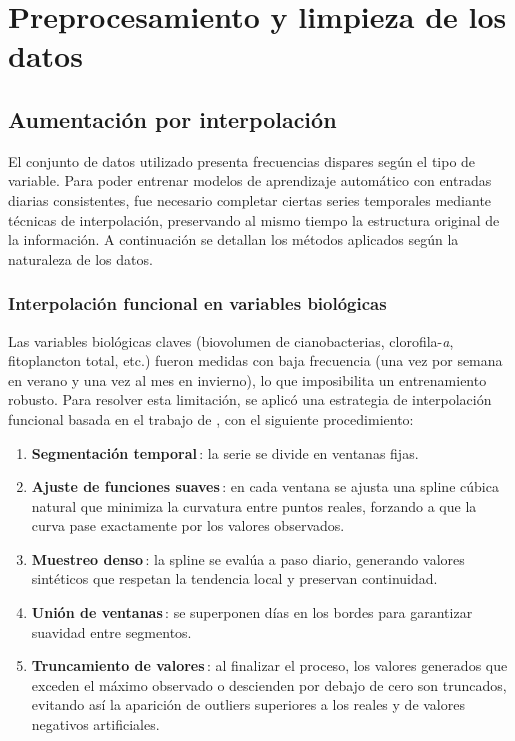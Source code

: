 \documentclass[11pt]{report}
\begin{document}
\section{Preprocesamiento y limpieza de los datos}

\subsection{Aumentación por interpolación}

El conjunto de datos utilizado presenta frecuencias dispares según el tipo de variable. Para poder entrenar modelos de aprendizaje automático con entradas diarias consistentes, fue necesario completar ciertas series temporales mediante técnicas de interpolación, preservando al mismo tiempo la estructura original de la información. A continuación se detallan los métodos aplicados según la naturaleza de los datos.

\subsubsection{Interpolación funcional en variables biológicas}

Las variables biológicas claves (biovolumen de cianobacterias, clorofila-\textit{a}, fitoplancton total, etc.) fueron medidas con baja frecuencia (una vez por semana en verano y una vez al mes en invierno), lo que imposibilita un entrenamiento robusto. Para resolver esta limitación, se aplicó una estrategia de interpolación funcional basada en el trabajo de \citep{Oh2020}, con el siguiente procedimiento:


\begin{enumerate}[noitemsep]
  \item \textbf{Segmentación temporal}\,: la serie se divide en ventanas fijas.
  \item \textbf{Ajuste de funciones suaves}\,: en cada ventana se ajusta una spline cúbica natural que minimiza la curvatura entre puntos reales, forzando a que la curva pase exactamente por los valores observados.
  \item \textbf{Muestreo denso}\,: la spline se evalúa a paso diario, generando valores sintéticos que respetan la tendencia local y preservan continuidad.
  \item \textbf{Unión de ventanas}\,: se superponen días en los bordes para garantizar suavidad entre segmentos.
  \item \textbf{Truncamiento de valores}\,: al finalizar el proceso, los valores generados que exceden el máximo observado o descienden por debajo de cero son truncados, evitando así la aparición de outliers superiores a los reales y de valores negativos artificiales.
\end{enumerate}
\end{document}
